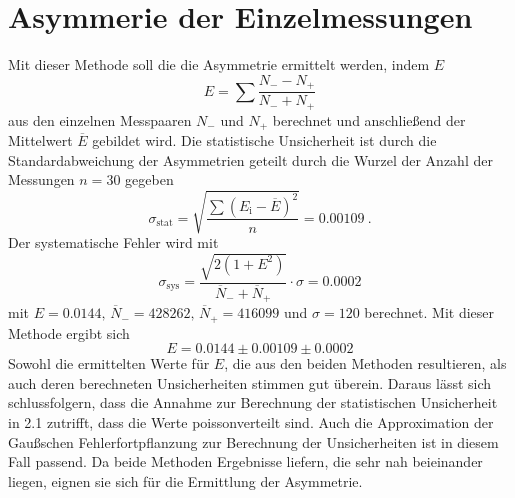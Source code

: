 \section{Asymmerie der Einzelmessungen}
Mit dieser Methode soll die die Asymmetrie ermittelt werden, indem $E$
$$E=\sum \frac{N_{-}-N_{+}}{N_{-}+N_{+}}$$
aus den einzelnen Messpaaren $N_{-}$ und $N_{+}$ berechnet und anschließend der Mittelwert $\overline{E}$ gebildet wird. Die statistische Unsicherheit ist durch die Standardabweichung der Asymmetrien geteilt durch die Wurzel der Anzahl der Messungen $n=30$ gegeben $$\sigma_\text{stat}= \sqrt{\frac{\sum (E_\text{i}-\overline{E})^{2}}{n}} = 0.00109~.$$ Der systematische Fehler wird mit 
 \begin{equation*}
     \sigma_\text{sys} = \frac{\sqrt{2(1+E^{2})}}{\overline{N}_{-}+\overline{N}_{+}} \cdot \sigma = 0.0002
 \end{equation*}
mit $E=0.0144,\, \overline{N}_{-}=428262,\, \overline{N}_{+}=416099$ und $\sigma=120$ berechnet. Mit dieser Methode ergibt sich $$E=0.0144 \pm 0.00109 \pm 0.0002$$
Sowohl die ermittelten Werte für $E$, die aus den beiden Methoden resultieren, als auch deren berechneten Unsicherheiten stimmen gut überein. Daraus lässt sich schlussfolgern, dass die Annahme zur Berechnung der statistischen Unsicherheit in 2.1 zutrifft, dass die Werte poissonverteilt sind. Auch die Approximation der Gaußschen Fehlerfortpflanzung zur Berechnung der Unsicherheiten ist in diesem Fall passend. Da beide Methoden Ergebnisse liefern, die sehr nah beieinander liegen, eignen sie sich für die Ermittlung der Asymmetrie.

